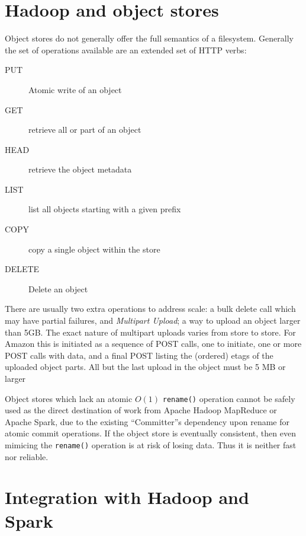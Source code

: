 \documentclass[9pt,technote]{IEEEtran}
\begin{document}

\section{Hadoop and object stores}
\label{sec:object-stores}





Object stores do not generally offer the full semantics of a filesystem.
Generally the set of operations available are an extended set of HTTP verbs:

\begin{description}
  \item[PUT] Atomic write of an object
  \item[GET] retrieve all or part of an object
  \item[HEAD] retrieve the object metadata
  \item[LIST] list all objects starting with a given prefix
  \item[COPY] copy a single object within the store
  \item[DELETE] Delete an object
\end{description}

There are usually two extra operations to address scale:
 a bulk delete call which may have partial failures,
and \emph{Multipart Upload}; a way to upload an object larger than 5GB\@.
The exact nature of multipart uploads varies from store to store.
For Amazon this is initiated as a sequence of POST calls, one to initiate,
one or more POST calls with data, and a final POST listing the (ordered)
etags of the uploaded object parts.
All but the last upload in the object must be 5 MB or larger


Object stores which lack an atomic $O(1)$ \texttt{rename()} operation cannot
be safely used as the direct destination of work from Apache Hadoop MapReduce
or Apache Spark, due to the existing ``Committer''s dependency upon rename for
atomic commit operations.
If the object store is eventually consistent, then even mimicing the \texttt{rename()}
operation is at risk of losing data.
Thus it is neither fast nor reliable.

\section{Integration with Hadoop and Spark}
\label{sec:integration}
\end{document}
